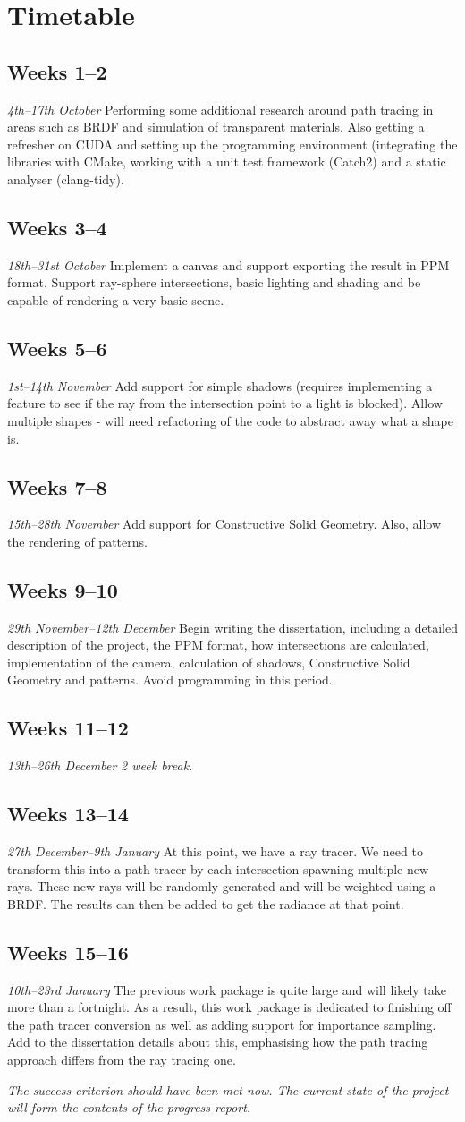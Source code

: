 \documentclass[12pt, a4paper]{article}
\newcommand{\newtime}[3]{
    \subsection*{#1}
    \vspace{-\baselineskip}
    \emph{#2}
    \vspace{\baselineskip}
    \newline
    #3
}
\begin{document}
    \section*{Timetable}
    \newtime{Weeks 1--2}{4th--17th October}{Performing some additional research around path tracing in areas such as BRDF and simulation of transparent materials. Also getting a refresher on CUDA and setting up the programming environment (integrating the libraries with CMake, working with a unit test framework (Catch2) and a static analyser (clang-tidy).}

    \newtime{Weeks 3--4}{18th--31st October}{Implement a canvas and support exporting the result in PPM format. Support ray-sphere intersections, basic lighting and shading and be capable of rendering a very basic scene.}

    \newtime{Weeks 5--6}{1st--14th November}{Add support for simple shadows (requires implementing a feature to see if the ray from the intersection point to a light is blocked). Allow multiple shapes - will need refactoring of the code to abstract away what a shape is.}

    \newtime{Weeks 7--8}{15th--28th November}{Add support for Constructive Solid Geometry. Also, allow the rendering of patterns.}

    \newtime{Weeks 9--10}{29th November--12th December}{Begin writing the dissertation, including a detailed description of the project, the PPM format, how intersections are calculated, implementation of the camera, calculation of shadows, Constructive Solid Geometry and patterns. Avoid programming in this period.}

    \newtime{Weeks 11--12}{13th--26th December}{\emph{2 week break.}}

    \newtime{Weeks 13--14}{27th December--9th January}{At this point, we have a ray tracer. We need to transform this into a path tracer by each intersection spawning multiple new rays. These new rays will be randomly generated and will be weighted using a BRDF. The results can then be added to get the radiance at that point.}

    \newtime{Weeks 15--16}{10th--23rd January}{The previous work package is quite large and will likely take more than a fortnight. As a result, this work package is dedicated to finishing off the path tracer conversion as well as adding support for importance sampling. Add to the dissertation details about this, emphasising how the path tracing approach differs from the ray tracing one. 
    
    \emph{The success criterion should have been met now. The current state of the project will form the contents of the progress report.}}
\end{document}
